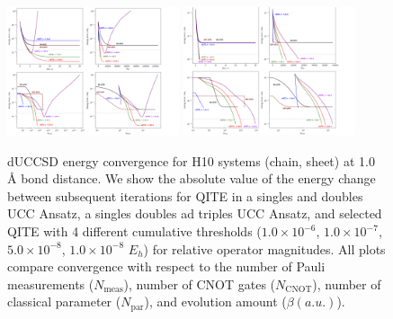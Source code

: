 \documentclass[aip,jcp,amsmath,amssymb, reprint]{revtex4-1}
\begin{document}
\begin{figure}[h!]
\centering
\includegraphics[width=0.45\textwidth]{sqite_paper/Chain 1.0 A.png}
\includegraphics[width=0.45\textwidth]{sqite_paper/Sheet 1.0 A.png}
\caption{dUCCSD energy convergence for H10 systems (chain, sheet) at 1.0 Å bond distance. We show the absolute value of the energy change between subsequent iterations for QITE in a singles and doubles UCC Ansatz, a singles doubles ad triples UCC Ansatz, and selected QITE with 4 different cumulative thresholds ($1.0 \times 10^{-6}$, $1.0 \times 10^{-7}$, $5.0 \times 10^{-8}$, $1.0 \times 10^{-8}$ $E_h$) for relative operator magnitudes. All plots compare convergence with respect to the number of Pauli measurements ($N_\mathrm{meas}$), number of CNOT gates ($N_\mathrm{CNOT}$), number of classical parameter ($N_\mathrm{par}$), and evolution amount ($\beta (a. u.)$).}
\label{fig:ene_plot_1.0A}
\end{figure}

\end{document}
